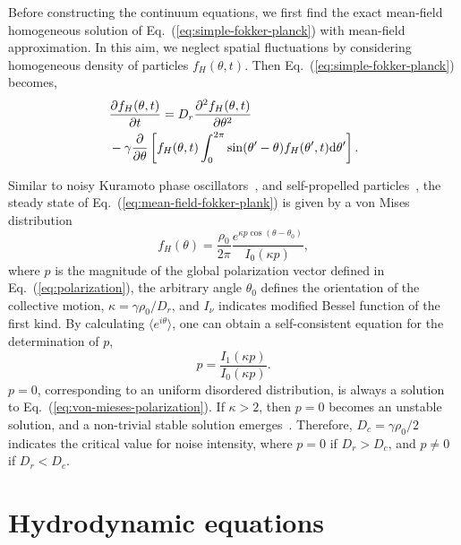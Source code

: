 \documentclass[reprint,floatfix,amsmath,amssymb,aps,pre,showkeys,showpacs,superscriptaddress]{revtex4-1}
\newcommand{\Dif}[2]{\frac{\partial #1}{\partial #2}}
\newcommand{\ave}[1]{\langle #1 \rangle}
\newcommand{\p}{p}
\newcommand{\dd}{{\rm d}}
\newcommand{\hl}[1]{\textcolor{hlcolor}{#1}}
\newcommand{\req}[1]{Eq.~(\ref{#1})}
\begin{document}
Before constructing the continuum equations, we first find the \hl{exact mean-field homogeneous solution} of \req{eq:simple-fokker-planck} with mean-field approximation. \hl{In this aim}, we neglect spatial fluctuations by considering homogeneous density of particles $f_H(\theta,t)$. Then \req{eq:simple-fokker-planck} becomes,
\begin{equation}
\begin{aligned}
&\Dif{{f}_H (\theta,t)}{t} = D_r \frac{\partial^2 f_H(\theta,t)}{\partial \theta^2} \\
&-\gamma \frac{\partial}{\partial \theta} \left[f_H(\theta,t) \int_0^{2\pi} \sin(\theta^\prime - \theta) f_H(\theta^\prime,t) \dd \theta^\prime \right].
\end{aligned}
\label{eq:mean-field-fokker-plank}
\end{equation}

Similar to noisy Kuramoto phase oscillators~\cite{Shinomoto1986phase,Sakaguchi1988phase}, and self-propelled particles~\cite{peruani2008mean,Grossmann2013}, the steady state of \req{eq:mean-field-fokker-plank} is given by a von Mises distribution
\begin{equation}
f_H(\theta) = \frac{\rho_0}{2 \pi} \frac{e^{\kappa \p \cos(\theta - \theta_0)}}{I_0(\kappa \p)},
\label{eq:von-mieses}
\end{equation}
where $\p$ is the magnitude of the global polarization vector \hl{defined in \req{eq:polarization}}, \hl{the arbitrary angle $\theta_0$ defines the orientation of the collective motion,} $\kappa=\gamma \rho_0 / D_r$, and $I_{\nu}$ indicates modified Bessel function of the first kind. By calculating $\ave{e^{i \theta}}$, one can obtain a self-consistent equation for the determination of $p$,
\begin{equation}
\p = \frac{I_1(\kappa \p)}{I_0(\kappa \p)}.
\label{eq:von-mieses-polarization}
\end{equation}
$\p = 0$, corresponding to an uniform disordered distribution, is always a solution to \req{eq:von-mieses-polarization}. If $\kappa > 2$, then $\p=0$ becomes an unstable solution, and a non-trivial stable solution emerges~\cite{Shinomoto1986phase,Sakaguchi1988phase}. Therefore\hl{,} $D_c = \gamma \rho_0 / 2$ indicates the critical value for noise intensity, where $\p=0$ if $D_r > D_c$, and $\p \neq 0$ if $D_r < D_c$.

\section{Hydrodynamic equations}
\label{section:hydrodynamics}
\end{document}
